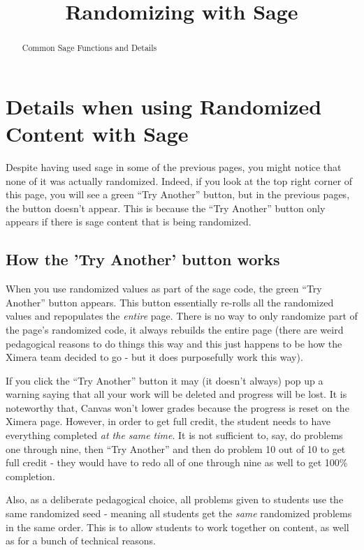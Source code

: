 \documentclass{ximera}
\title{Randomizing with Sage}
\begin{document}
\begin{abstract}
     Common Sage Functions and Details
\end{abstract}
\maketitle

\section{Details when using Randomized Content with Sage}
    Despite having used sage in some of the previous pages, you might notice that none of it was actually randomized. Indeed, if you look at the top right corner of this page, you will see a green ``Try Another'' button, but in the previous pages, the button doesn't appear. This is because the ``Try Another'' button only appears if there is sage content that is being randomized.
    
    \subsection{How the 'Try Another' button works}
        When you use randomized values as part of the sage code, the green ``Try Another'' button appears. This button essentially re-rolls all the randomized values and repopulates the \textit{entire} page. There is no way to only randomize part of the page's randomized code, it always rebuilds the entire page (there are weird pedagogical reasons to do things this way and this just happens to be how the Ximera team decided to go - but it does purposefully work this way).
        
        If you click the ``Try Another'' button it may (it doesn't always) pop up a warning saying that all your work will be deleted and progress will be lost. It is noteworthy that, Canvas won't lower grades because the progress is reset on the Ximera page. However, in order to get full credit, the student needs to have everything completed \textit{at the same time}. It is not sufficient to, say, do problems one through nine, then ``Try Another'' and then do problem 10 out of 10 to get full credit - they would have to redo all of one through nine as well to get 100\% completion.
        
        Also, as a deliberate pedagogical choice, all problems given to students use the same randomized seed - meaning all students get the \textit{same} randomized problems in the same order. This is to allow students to work together on content, as well as for a bunch of technical reasons.
\end{document}
